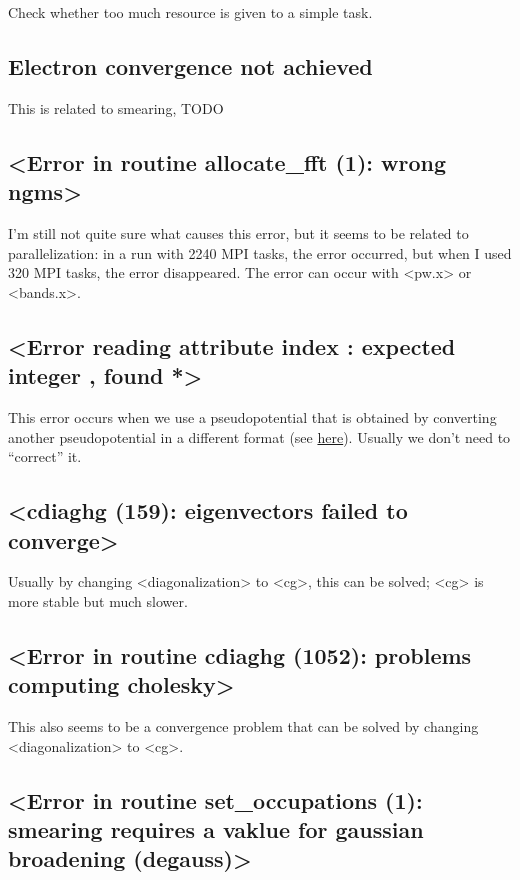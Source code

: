 \documentclass[hyperref, a4paper, 12pt]{report}
\def\texttt#1{<#1>}%
\newcommand{\shortcode}[1]{\texttt{#1}}
\begin{document}
Check whether too much resource is given to a simple task.

\subsection{Electron convergence not achieved}

This is related to smearing, TODO 

\subsection{\shortcode{Error in routine allocate_fft (1): wrong ngms}}\label{sec:ngms}

I'm still not quite sure what causes this error,
but it seems to be related to parallelization:
in a run with 2240 MPI tasks, 
the error occurred,
but when I used 320 MPI tasks,
the error disappeared.
The error can occur with \shortcode{pw.x} or \shortcode{bands.x}.

\subsection{\shortcode{Error reading attribute index : expected integer , found *}}

This error occurs when we use a pseudopotential 
that is obtained by converting another pseudopotential in a different format
(see \href{https://lists.quantum-espresso.org/pipermail/users/2021-February/046995.html}{here}). 
Usually we don't need to ``correct'' it.

\subsection{\shortcode{cdiaghg (159): eigenvectors failed to converge}}

Usually by changing \shortcode{diagonalization} to \shortcode{cg},
this can be solved; 
\shortcode{cg} is more stable but much slower.

\subsection{\shortcode{Error in routine  cdiaghg (1052):  problems computing cholesky}}

This also seems to be a convergence problem 
that can be solved by changing \shortcode{diagonalization} to \shortcode{cg}.

\subsection{\shortcode{Error in routine  set_occupations (1): smearing requires a vaklue for gaussian broadening (degauss)}}
\end{document}
